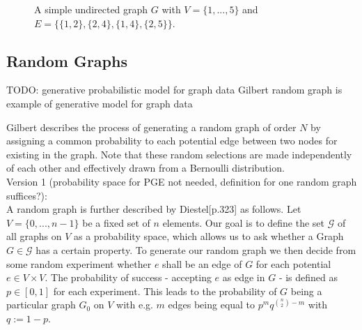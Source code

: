 \begin{figure}[h]
    \centering
    \caption{A simple undirected graph $G$ with $V=\{1,...,5\}$ and $E=\{\{1,2\},\{2,4\},\{1,4\},\{2,5\}\}$.}
    \label{fig:graph-example}
\end{figure}

\subsection{Random Graphs}
\label{sec:random-graphs}
TODO: generative probabilistic model for graph data
Gilbert random graph is example of generative model for graph data

Gilbert\cite{gilbert1959random} describes the process of generating a random graph of order $N$ by assigning a common probability to each potential edge between two nodes for existing in the graph. Note that these random selections are made independently of each other and effectively drawn from a Bernoulli distribution. \\
Version 1 (probability space for PGE not needed, definition for one random graph suffices?): \\
A random graph is further described by Diestel\cite{Diestel2017}[p.323] as follows. Let $V = \{0,...,n-1\}$ be a fixed set of $n$ elements. Our goal is to define the set $\mathcal{G}$ of all graphs on $V$ as a probability space, which allows us to ask whether a Graph $G \in \mathcal{G}$ has a certain property. To generate our random graph we then decide from some random experiment whether $e$ shall be an edge of $G$ for each potential $e \in V \times V$. The probability of success - accepting $e$ as edge in $G$ - is defined as $p \in [0,1]$ for each experiment. This leads to the probability of $G$ being a particular graph $G_0$ on $V$ with e.g. $m$ edges being equal to $p^m q^{\binom{n}{2}-m}$ with $q:=1-p$.
\bigskip

